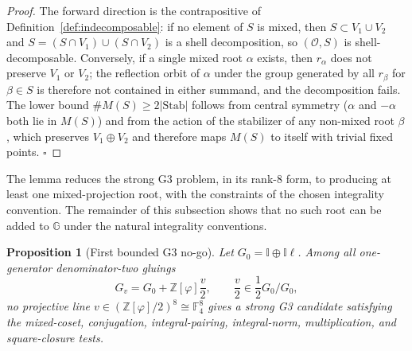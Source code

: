 \documentclass[12pt,oneside,english]{amsart}
\numberwithin{equation}{section}
\numberwithin{figure}{section}
\numberwithin{table}{section}
\theoremstyle{plain}
\newtheorem{proposition}[theorem]{Proposition}
\theoremstyle{definition}
\theoremstyle{remark}
\newcommand{\Zphi}{\mathbb Z[\varphi]}
\begin{document}
\begin{proof}
The forward direction is the contrapositive of Definition~\ref{def:indecomposable}: if no element of \(S\) is mixed, then \(S\subset V_{1}\cup V_{2}\) and \(S=(S\cap V_{1})\cup(S\cap V_{2})\) is a shell decomposition, so \((\mathcal{O},S)\) is shell-decomposable. Conversely, if a single mixed root \(\alpha\) exists, then \(r_{\alpha}\) does not preserve \(V_{1}\) or \(V_{2}\); the reflection orbit of \(\alpha\) under the group generated by all \(r_{\beta}\) for \(\beta\in S\) is therefore not contained in either summand, and the decomposition fails. The lower bound \(\#M(S)\geq 2|\mathrm{Stab}|\) follows from central symmetry (\(\alpha\) and \(-\alpha\) both lie in \(M(S)\)) and from the action of the stabilizer of any non-mixed root \(\beta\), which preserves \(V_{1}\oplus V_{2}\) and therefore maps \(M(S)\) to itself with trivial fixed points. \(\square\)
\end{proof}

The lemma reduces the strong G3 problem, in its rank-\(8\) form, to producing at least one mixed-projection root, with the constraints of the chosen integrality convention. The remainder of this subsection shows that no such root can be added to \(\mathbb G\) under the natural integrality conventions.

\begin{proposition}[First bounded G3 no-go]
\label{prop:bounded-g3-no-go}
Let \(G_0=\mathbb I\oplus\mathbb I\ell\). Among all one-generator denominator-two gluings
\begin{equation}
G_v=G_0+\Zphi\frac{v}{2},
\qquad
\frac{v}{2}\in \frac12G_0/G_0,
\label{eq:single-line-gluing}
\end{equation}
no projective line \(v\in(\Zphi/2)^8\cong\mathbb F_4^8\) gives a strong G3 candidate satisfying the mixed-coset, conjugation, integral-pairing, integral-norm, multiplication, and square-closure tests.
\end{proposition}
\end{document}
